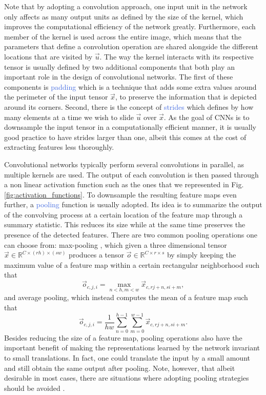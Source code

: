 Note that by adopting a convolution approach, one input unit in the network only affects as many output units as defined by the size of the kernel, which improves the computational efficiency of the network greatly. Furthermore, each member of the kernel is used across the entire image, which means that the parameters that define a convolution operation are shared alongside the different locations that are visited by $\vec{u}$. The way the kernel interacts with its respective tensor is usually defined by two additional components that both play an important role in the design of convolutional networks. The first of these components is \textcolor{RoyalBlue}{padding} which is a technique that adds some extra values around the perimeter of the input tensor $\vec{x}$, to preserve the information that is depicted around its corners. Second, there is the concept of \textcolor{RoyalBlue}{strides} which defines by how many elements at a time we wish to slide $\vec{u}$ over $\vec{x}$. As the goal of CNNs is to downsample the input tensor in a computationally efficient manner, it is usually good practice to have strides larger than one, albeit this comes at the cost of extracting features less thoroughly. 

Convolutional networks typically perform several convolutions in parallel, as multiple kernels are used. The output of each convolution is then passed through a non linear activation function such as the ones that we represented in Fig. \ref{fig:activation_functions}. To downsample the resulting feature maps even further, a \textcolor{RoyalBlue}{pooling} function is usually adopted. Its idea is to summarize the output of the convolving process at a certain location of the feature map through a summary statistic. This reduces its size while at the same time preserves the presence of the detected features. There are two common pooling operations one can choose from: max-pooling \cite{zhou1988computation}, which given a three dimensional tensor $\vec{x}\in\mathds{R}^{C\times(rh)\times(sw)}$ produces a tensor $\vec{o}\in\mathds{R}^{C\times r\times s}$ by simply keeping the maximum value of a feature map within a certain rectangular neighborhood such that 
\begin{equation}
	\vec{o}_{c,j,i} = \underset{n<h,m<w}{\max} \vec{x}_{c,rj+n,si+m},
\end{equation}
and average pooling, which instead computes the mean of a feature map such that 
\begin{equation}
	\vec{o}_{c,j,i} = \frac{1}{hw} \sum_{n=0}^{h-1}\sum_{m=0}^{w-1} \vec{x}_{c,rj+n,si+m}.
\end{equation}
Besides reducing the size of a feature map, pooling operations also have the important benefit of making the representations learned by the network invariant to small translations. In fact, one could translate the input by a small amount and still obtain the same output after pooling. Note, however, that albeit desirable in most cases, there are situations where adopting pooling strategies should be avoided \cite{sabatelli2018learning, bidoiadeep}.  


